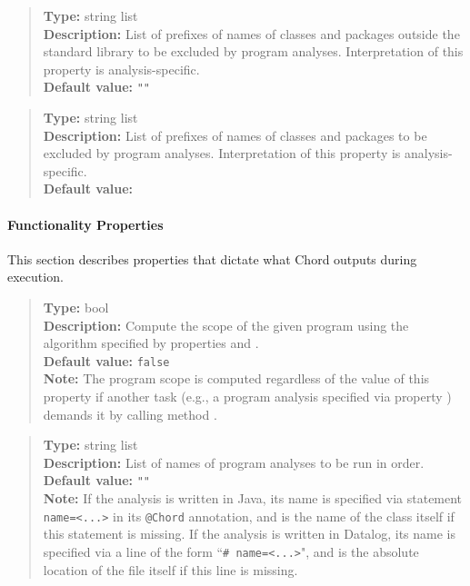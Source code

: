 \noindent {}
\begin{quote}
{\bf Type:} string list \\
{\bf Description:} List of prefixes of names of classes and packages outside the standard library to be excluded by program analyses.  Interpretation of this property is analysis-specific. \\
{\bf Default value:} {\tt ""}
\end{quote}

\noindent {}
\begin{quote}
{\bf Type:} string list \\
{\bf Description:} List of prefixes of names of classes and packages to be excluded by program analyses.  Interpretation of this property is analysis-specific. \\
{\bf Default value:} 
\end{quote}

\paragraph{Functionality Properties}

This section describes properties that dictate what Chord outputs during execution.

\noindent {}
\begin{quote}
{\bf Type:} bool \\
{\bf Description:} Compute the scope of the given program using the algorithm specified by properties  and . \\
{\bf Default value:} {\tt false} \\
{\bf Note:} The program scope is computed regardless of the value of this property if another task (e.g., a program analysis specified via property ) demands it by calling method . 
\end{quote}

\noindent {}
\begin{quote}
{\bf Type:} string list  \\
{\bf Description:} List of names of program analyses to be run in order. \\
{\bf Default value:} {\tt ""} \\
{\bf Note:} If the analysis is written in Java, its name is specified via statement {\tt name=<...>} in its {\tt @Chord} annotation, and is the name of the class itself if this statement is missing.  If the analysis is written in Datalog, its name is specified via a line of the form ``{\tt \# name=<...>}", and is the absolute location of the file itself if this line is missing. 
\end{quote}

